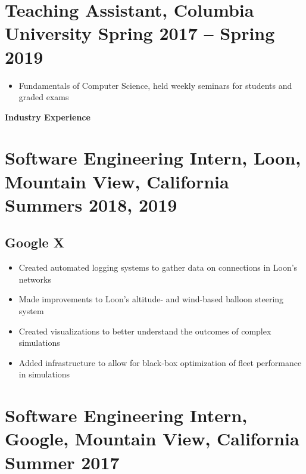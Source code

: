 \documentclass{article}
\begin{document}
\section*{\textbf{Teaching Assistant, Columbia University \hfill	Spring 2017 -- Spring 2019 }}
\begin{itemize}
    \item Fundamentals of Computer Science, held weekly seminars for students and graded exams
\end{itemize}


\noindent
\large{\textbf{Industry Experience}}
\section*{\textbf{Software Engineering Intern, Loon, Mountain View, California \hfill Summers 2018, 2019}}
\subsection*{Google X}
\begin{itemize}[noitemsep]
    \item Created automated logging systems to gather data on connections in Loon’s networks
    \item Made improvements to Loon's altitude- and wind-based balloon steering system
    \item Created visualizations to better understand the outcomes of complex simulations
    \item Added infrastructure to allow for black-box optimization of fleet performance in simulations
\end{itemize}

\section*{\textbf{Software Engineering Intern, Google, Mountain View, California \hfill Summer 2017}}
\end{document}
